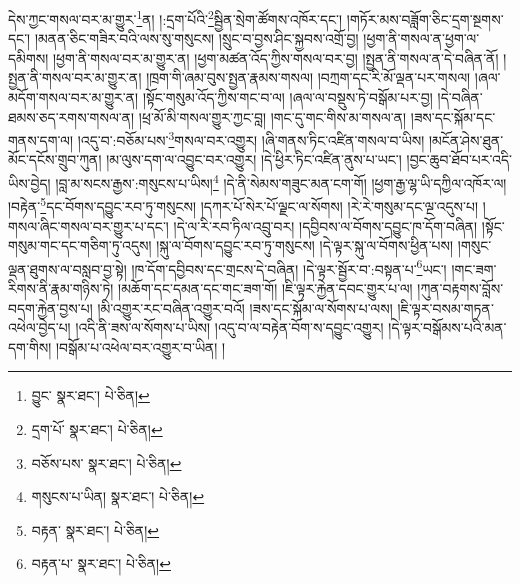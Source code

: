 དེས་ཀྱང་གསལ་བར་མ་གྱུར་\footnote{བྱུང་  སྣར་ཐང་།  པེ་ཅིན། }ན། །:དྲག་པོའི་\footnote{དྲག་པོ་  སྣར་ཐང་།  པེ་ཅིན། }སྦྱིན་སྲེག་ཚོགས་འཁོར་དང་། །གཏོར་མས་བཟློག་ཅིང་དྲག་སྔགས་དང་། །མནན་ཅིང་གཟིར་བའི་ལས་སུ་གསུངས། །སྲུང་བ་བྱས་ཤིང་སྐྱབས་འགྲོ་བྱ། །ཕྱག་ནི་གསལ་ན་ཕྱག་ལ་དམིགས། །ཕྱག་ནི་གསལ་བར་མ་གྱུར་ན། །ཕྱག་མཚན་འོད་ཀྱིས་གསལ་བར་བྱ། །སྤྱན་ནི་གསལ་ན་དེ་བཞིན་ནོ། །སྤྱན་ནི་གསལ་བར་མ་གྱུར་ན། །ཁྲག་གི་ཞམ་བུས་སྤྱན་རྣམས་གསལ། །བཀྲག་དང་རི་མོ་ལྡན་པར་གསལ། །ཞལ་མདོག་གསལ་བར་མ་གྱུར་ན། །སྟོང་གསུམ་འོད་ཀྱིས་གང་བ་ལ། །ཞལ་ལ་བསྡུས་ཏེ་བསྒོམ་པར་བྱ། །དེ་བཞིན་ཐམས་ཅད་རགས་གསལ་ན། །ཕྲ་མོ་མི་གསལ་གྱུར་ཀྱང་བླ། །གང་དུ་གང་གིས་མ་གསལ་ན། །ཟས་དང་སྐོམ་དང་གནས་དག་ལ། །འདུ་བ་:བཅོམ་པས་\footnote{བཅོས་པས་  སྣར་ཐང་།  པེ་ཅིན། }གསལ་བར་འགྱུར། །ཞི་གནས་ཏིང་འཛིན་གསལ་བ་ཡིས། །མངོན་ཤེས་ཐུན་མོང་དངོས་གྲུབ་ཀུན། །མ་ལུས་དག་ལ་འབྱུང་བར་འགྱུར། །དེ་ཕྱིར་ཏིང་འཛིན་ནུས་པ་ཡང་། །བྱང་ཆུབ་ཐོབ་པར་འདི་ཡིས་བྱེད། །བླ་མ་སངས་རྒྱས་:གསུངས་པ་ཡིས།\footnote{གསུངས་པ་ཡིན།  སྣར་ཐང་།  པེ་ཅིན། } །དེ་ནི་སེམས་གཟུང་མན་ངག་གོ། །ཕྱག་རྒྱ་ལྷ་ཡི་དཀྱིལ་འཁོར་ལ། །བརྟེན་\footnote{བརྟན་  སྣར་ཐང་།  པེ་ཅིན། }དང་བོགས་དབྱུང་རབ་ཏུ་གསུངས། །དཀར་པོ་སེར་པོ་ལྗང་ལ་སོགས། །རེ་རེ་གསུམ་དང་ལྔ་འདུས་པ། །གསལ་ཞིང་གསལ་བར་གྱུར་པ་དང་། །དེ་ལ་རི་རབ་ཏིལ་འབྲུ་བར། །དབྱིབས་ལ་བོགས་དབྱུང་ཁ་དོག་བཞིན། །སྟོང་གསུམ་གང་དང་གཅིག་ཏུ་འདུས། །སྐུ་ལ་བོགས་དབྱུང་རབ་ཏུ་གསུངས། །དེ་ལྟར་སྐུ་ལ་བོགས་ཕྱིན་པས། །གསུང་ལྡན་ཐུགས་ལ་བསླབ་བྱ་སྟེ། །ཁ་དོག་དབྱིབས་དང་གྲངས་དེ་བཞིན། །དེ་ལྟར་སྦྱོར་བ་:བསྟན་པ་\footnote{བརྟན་པ་  སྣར་ཐང་།  པེ་ཅིན། }ཡང་། །གང་ཟག་རིགས་ནི་རྣམ་གཉིས་ཏེ། །མཆོག་དང་དམན་དང་གང་ཟག་གོ། །ཇི་ལྟར་རྐྱེན་དབང་གྱུར་པ་ལ། །ཀུན་བརྟགས་བློས་བདག་རྐྱེན་བྱས་པ། །མི་འགྱུར་རང་བཞིན་འགྱུར་བའོ། །ཟས་དང་སྐོམ་ལ་སོགས་པ་ལས། །ཇི་ལྟར་བསམ་གཏན་འཕེལ་བྱེད་པ། །འདི་ནི་ཟས་ལ་སོགས་པ་ཡིས། །འདུ་བ་ལ་བརྟེན་བོག་ས་དབྱུང་འགྱུར། །དེ་ལྟར་བསྒོམས་པའི་མན་དག་གིས། །བསྒོམ་པ་འཕེལ་བར་འགྱུར་བ་ཡིན། །
